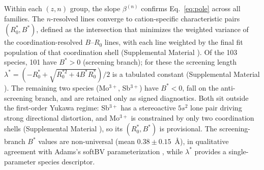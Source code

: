 \documentclass[aps,prl,twocolumn,10pt,superscriptaddress,floatfix]{revtex4-2}
\begin{document}
Within each $(z,n)$ group, the slope $\beta^{(n)}$ confirms
Eq.~\eqref{eq:pole} across all families.  The $n$-resolved lines
converge to cation-specific characteristic pairs
$(R_0^*,B^*)$, defined as the intersection that minimizes
the weighted variance of the coordination-resolved $B$--$R_0$ lines,
with each line weighted by the final fit population of that
coordination shell (Supplemental Material \cite{suppmat}).
Of the 103 species, 101 have $B^*>0$ (screening branch);
for these the screening length
$\lambda^*=(-R_0^*+\sqrt{R_0^{*2}+4B^*R_0^*})/2$ is a tabulated
constant (Supplemental Material \cite{suppmat}).  The remaining two
species (Mo$^{3+}$, Sb$^{3+}$) have $B^*<0$, fall on the anti-screening branch, and are
retained only as signed diagnostics.  Both sit outside the first-order
Yukawa regime: Sb$^{3+}$ has a stereoactive $5s^2$ lone pair driving
strong directional distortion, and Mo$^{3+}$ is constrained by only two
coordination shells (Supplemental Material \cite{suppmat}), so its
$(R_0^*,B^*)$ is provisional.  The screening-branch $B^*$ values are non-universal
(mean $0.38\pm0.15$~\AA), in qualitative agreement with Adams's softBV
parameterization \cite{Adams2001}, while $\lambda^*$ provides a
single-parameter species descriptor.
\end{document}
